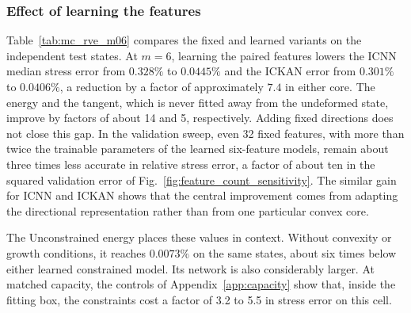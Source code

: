 \subsubsection{Effect of learning the features}
Table~\ref{tab:mc_rve_m06} compares the fixed and learned variants on the independent test states.  At $m=6$, learning the paired features lowers the ICNN median stress error from $0.328\%$ to $0.0445\%$ and the ICKAN error from $0.301\%$ to $0.0406\%$, a reduction by a factor of approximately $7.4$ in either core.  The energy and the tangent, which is never fitted away from the undeformed state, improve by factors of about 14 and 5, respectively.  Adding fixed directions does not close this gap.  In the validation sweep, even 32 fixed features, with more than twice the trainable parameters of the learned six-feature models, remain about three times less accurate in relative stress error, a factor of about ten in the squared validation error of Fig.~\ref{fig:feature_count_sensitivity}.  The similar gain for ICNN and ICKAN shows that the central improvement comes from adapting the directional representation rather than from one particular convex core.

The Unconstrained energy places these values in context.  Without convexity or growth conditions, it reaches $0.0073\%$ on the same states, about six times below either learned constrained model.  Its network is also considerably larger.  At matched capacity, the controls of Appendix~\ref{app:capacity} show that, inside the fitting box, the constraints cost a factor of 3.2 to 5.5 in stress error on this cell.

\begin{table}[htbp]
 \centering\small
 \caption{MC-RVE independent-test errors at $m=6$.  Each entry is the relative error norm of the stress $\ssv$, the energy $W$, or the tangent $\bm D$ of Eq.~\eqref{eq:tangent} over the 512 test states, as the median over three seeds.  For every quantity, each learned seed is more accurate than each fixed seed.  Adam stopped at a validation plateau for the fixed variants, whereas five of the six learned runs and the Unconstrained energy, which has no paired features, reached the 200\,000-step cap.}
 \label{tab:mc_rve_m06}
 
\end{table}

